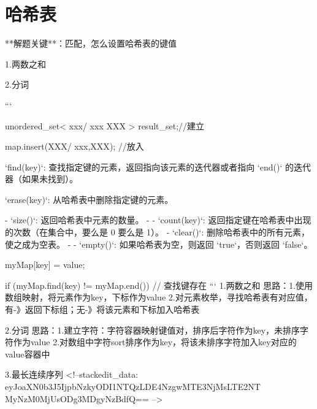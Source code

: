 \chapter{哈希表}

**解题关键**：匹配，怎么设置哈希表的键值


1.两数之和

2.分词

```

unordered_set< xxx/ xxx XXX > result_set;//建立

map.insert(XXX/ {xxx,XXX}); //放入

`find(key)`: 查找指定键的元素，返回指向该元素的迭代器或者指向 `end()` 的迭代器（如果未找到）。

`erase(key)`: 从哈希表中删除指定键的元素。

-   `size()`: 返回哈希表中元素的数量。
- -   `count(key)`: 返回指定键在哈希表中出现的次数（在集合中，要么是 0 要么是 1）。
-   `clear()`: 删除哈希表中的所有元素，使之成为空表。
- -   `empty()`: 如果哈希表为空，则返回 `true`，否则返回 `false`。

myMap[key] = value;

if (myMap.find(key) != myMap.end()) {
    // 查找键存在
}
```
1.两数之和
思路：1.使用数组映射，将元素作为key，下标作为value
2.对元素枚举，寻找哈希表有对应值，有-》返回下标组；无-》将该元素和下标加入哈希表

2.分词
思路：1.建立字符：字符容器映射键值对，排序后字符作为key，未排序字符作为value
2.对数组中字符sort排序作为key，将该未排序字符加入key对应的value容器中

3.最长连续序列
<!--stackedit_data:
eyJoaXN0b3J5IjpbNzkyODI1NTQzLDE4NzgwMTE3NjMsLTE2NT
MyNzM0MjUsODg3MDgyNzBdfQ==
-->